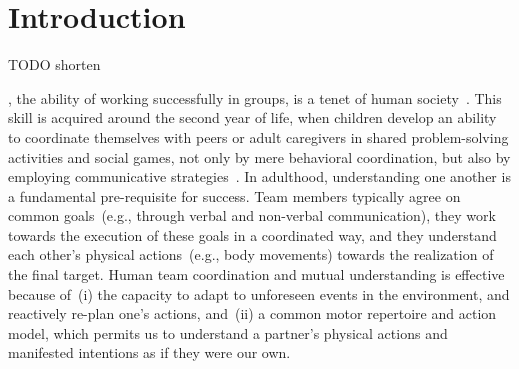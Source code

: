 
\section{Introduction}
\label{sec:intro}

TODO shorten

, the ability of working successfully in groups, is a tenet of human society~\cite{turner:1975}.
This skill is acquired around the second year of life, when children develop an ability to coordinate themselves with peers or adult caregivers in shared problem-solving activities and social games, not only by mere behavioral coordination, but also by
employing communicative strategies~\cite{melis:2010:rstb}.
In adulthood, understanding one another is a fundamental pre-requisite for success.
Team members typically agree on common goals~(e.g., through verbal and non-verbal communication), they work towards the execution of these goals in a coordinated way, and they understand each other's physical actions~(e.g., body movements) towards the realization of the final target.
Human team coordination and mutual understanding is effective~\cite{ramnani:2004:natureneuro} because of~(i) the capacity to adapt to unforeseen events in the environment, and reactively re-plan one's actions, and~(ii) a common motor repertoire and action model, which permits us to understand a partner's physical actions and manifested intentions as if they were our own.
